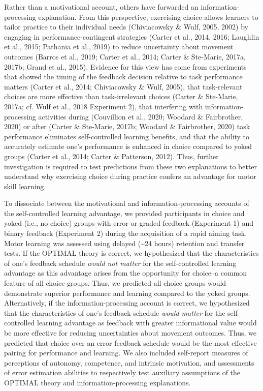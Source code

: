 \documentclass[
  doc, donotrepeattitle,floatsintext]{apa7}
\begin{document}
Rather than a motivational account, others have forwarded an information-processing explanation. From this perspective, exercising choice allows learners to tailor practice to their individual needs (Chiviacowsky \& Wulf, 2005, 2002) by engaging in performance-contingent strategies (Carter et al., 2014, 2016; Laughlin et al., 2015; Pathania et al., 2019) to reduce uncertainty about movement outcomes (Barros et al., 2019; Carter et al., 2014; Carter \& Ste-Marie, 2017a, 2017b; Grand et al., 2015). Evidence for this view has come from experiments that showed the timing of the feedback decision relative to task performance matters (Carter et al., 2014; Chiviacowsky \& Wulf, 2005), that task-relevant choices are more effective than task-irrelevant choices (Carter \& Ste-Marie, 2017a; cf. Wulf et al., 2018 Experiment 2), that interfering with information-processing activities during (Couvillion et al., 2020; Woodard \& Fairbrother, 2020) or after (Carter \& Ste-Marie, 2017b; Woodard \& Fairbrother, 2020) task performance eliminates self-controlled learning benefits, and that the ability to accurately estimate one's performance is enhanced in choice compared to yoked groups (Carter et al., 2014; Carter \& Patterson, 2012). Thus, further investigation is required to test predictions from these two explanations to better understand why exercising choice during practice confers an advantage for motor skill learning.

To dissociate between the motivational and information-processing accounts of the self-controlled learning advantage, we provided participants in choice and yoked (i.e., no-choice) groups with error or graded feedback (Experiment 1) and binary feedback (Experiment 2) during the acquisition of a rapid aiming task. Motor learning was assessed using delayed (\textasciitilde24 hours) retention and transfer tests. If the OPTIMAL theory is correct, we hypothesized that the characteristics of one's feedback schedule \emph{would not matter} for the self-controlled learning advantage as this advantage arises from the opportunity for choice--a common feature of all choice groups. Thus, we predicted all choice groups would demonstrate superior performance and learning compared to the yoked groups. Alternatively, if the information-processing account is correct, we hypothesized that the characteristics of one's feedback schedule \emph{would matter} for the self-controlled learning advantage as feedback with greater informational value would be more effective for reducing uncertainties about movement outcomes. Thus, we predicted that choice over an error feedback schedule would be the most effective pairing for performance and learning. We also included self-report measures of perceptions of autonomy, competence, and intrinsic motivation, and assessments of error estimation abilities to respectively test auxiliary assumptions of the OPTIMAL theory and information-processing explanations.
\end{document}
